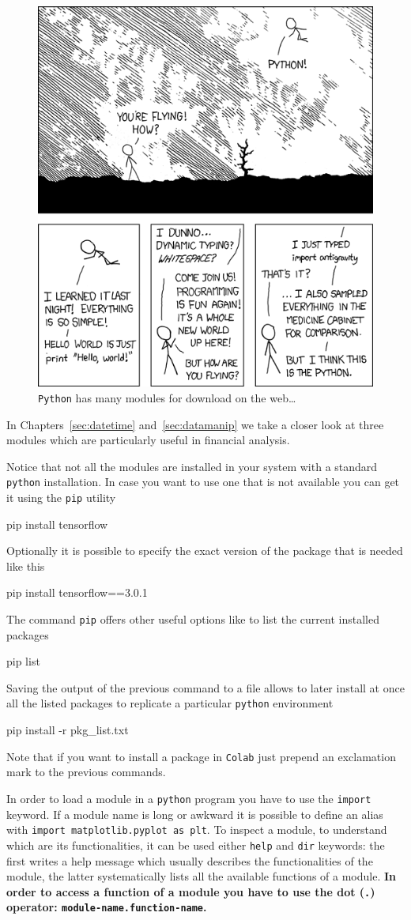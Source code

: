 \begin{figure}
\centering
\includegraphics[width=0.5\linewidth]{figures/python.png}
\caption{\texttt{Python} has many modules for download on the web\ldots}
\label{fig:fancy_module}
\end{figure}

In Chapters~\ref{sec:datetime} and~\ref{sec:datamanip} we take a closer look at three modules which are particularly useful in financial analysis.

Notice that not all the modules are installed in your system with a standard \texttt{python} installation. In case you want to use one that is not available you can get it using the \texttt{pip} utility
\begin{ioutput}
pip install tensorflow
\end{ioutput}
Optionally it is possible to specify the exact version of the package that is needed like this
\begin{ioutput}
pip install tensorflow==3.0.1
\end{ioutput}
The command \texttt{pip} offers other useful options like to list the current installed packages
\begin{ioutput}
pip list
\end{ioutput}
Saving the output of the previous command to a file allows to later install at once all the listed packages to replicate a particular \texttt{python} environment

\begin{ioutput}
pip install -r pkg_list.txt
\end{ioutput}

Note that if you want to install a package in \texttt{Colab} just prepend an exclamation mark to the previous commands. 

In order to load a module in a \texttt{python} program you have to use the \texttt{import} keyword.
If a module name is long or awkward it is possible to define an alias with \texttt{import matplotlib.pyplot as plt}. To inspect a module, to understand which are its functionalities, it can be used either \texttt{help} and \texttt{dir} keywords: the first writes a help message which usually describes the functionalities of the module, the latter systematically lists all the available functions of a module.
\textbf{In order to access a function of a module you have to use the dot (\texttt{.}) operator: \texttt{module-name.function-name}.}

